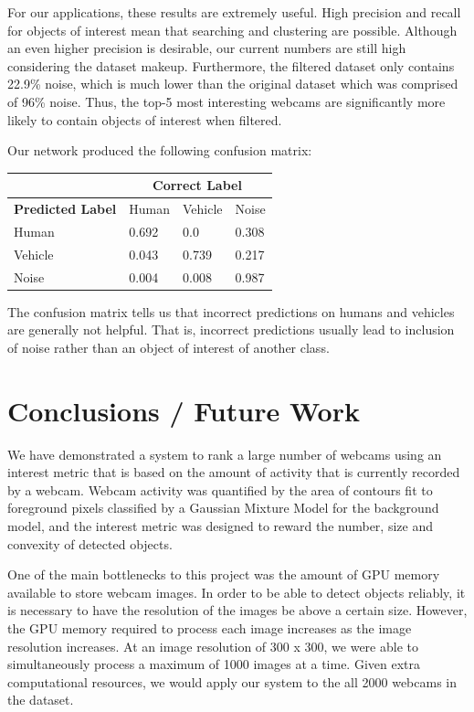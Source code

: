 \documentclass[10pt]{article} %
\begin{document}
For our applications, these results are extremely useful. High precision and
recall for objects of interest mean that searching and clustering are possible.
Although an even higher precision is desirable, our current numbers are still
high considering the dataset makeup. Furthermore, the filtered dataset only
contains 22.9\% noise, which is much lower than the original dataset which was
comprised of 96\% noise. Thus, the top-5 most interesting webcams are
significantly more likely to contain objects of interest when filtered.

Our network produced the following confusion matrix:
\begin{center}
  \begin{tabular}{ | m{8em} | m{5em}| m{5em} | m{5em} | }
    \hline
    & \multicolumn{3}{c|}{\textbf{Correct Label}} \\ 
    \hline
    \textbf{Predicted Label} & Human & Vehicle & Noise \\
    \hline
    Human & 0.692 & 0.0 & 0.308 \\
    \hline
    Vehicle & 0.043 & 0.739 & 0.217 \\
    \hline
    Noise & 0.004 & 0.008 & 0.987 \\
    \hline
  \end{tabular}
\end{center}
The confusion matrix tells us that incorrect predictions on humans and vehicles
are generally not helpful. That is, incorrect predictions usually lead to
inclusion of noise rather than an object of interest of another class.


\section{Conclusions / Future Work}
We have demonstrated a system to rank a large number of webcams using an interest metric that is based on the amount of activity that is currently recorded by a webcam. Webcam activity was quantified by the area of contours fit to foreground pixels classified by a Gaussian Mixture Model for the background model, and the interest metric was designed to reward the number, size and convexity of detected objects. 

One of the main bottlenecks to this project was the amount of GPU memory available to store webcam images. In order to be able to detect objects reliably, it is necessary to have the resolution of the images be above a certain size. However, the GPU memory required to process each image increases as the image resolution increases. At an image resolution of 300 x 300, we were able to simultaneously process a maximum of 1000 images at a time. Given extra computational resources, we would apply our system to the all 2000 webcams in the dataset.
\end{document}
